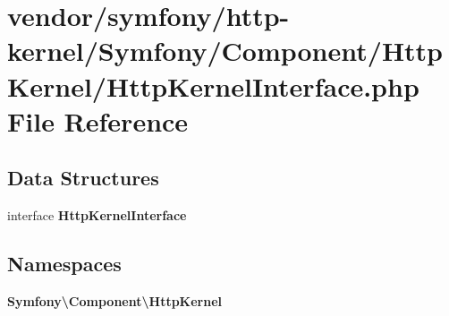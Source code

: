 \section{vendor/symfony/http-\/kernel/\+Symfony/\+Component/\+Http\+Kernel/\+Http\+Kernel\+Interface.php File Reference}
\label{_http_kernel_interface_8php}
\subsection*{Data Structures}
\begin{DoxyCompactItemize}
\item 
interface {\bf Http\+Kernel\+Interface}
\end{DoxyCompactItemize}
\subsection*{Namespaces}
\begin{DoxyCompactItemize}
\item 
 {\bf Symfony\textbackslash{}\+Component\textbackslash{}\+Http\+Kernel}
\end{DoxyCompactItemize}
